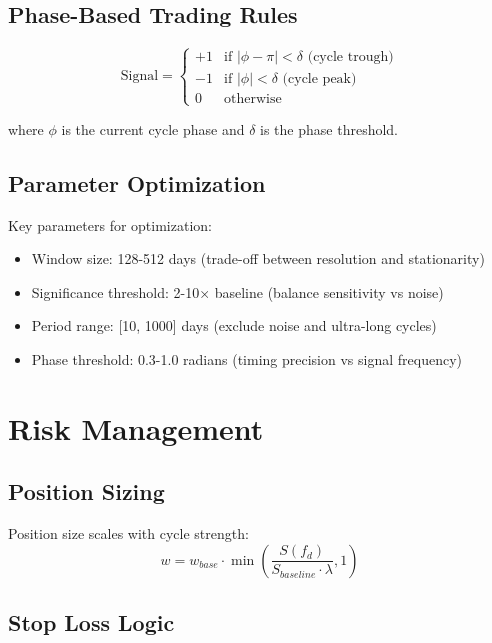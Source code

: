 \documentclass{article}
\begin{document}
\subsection{Phase-Based Trading Rules}

\begin{equation}
\text{Signal} = \begin{cases}
+1 & \text{if } |\phi - \pi| < \delta \text{ (cycle trough)} \\
-1 & \text{if } |\phi| < \delta \text{ (cycle peak)} \\
0 & \text{otherwise}
\end{cases}
\end{equation}

where $\phi$ is the current cycle phase and $\delta$ is the phase threshold.

\subsection{Parameter Optimization}

Key parameters for optimization:
\begin{itemize}
\item Window size: 128-512 days (trade-off between resolution and stationarity)
\item Significance threshold: 2-10× baseline (balance sensitivity vs noise)
\item Period range: [10, 1000] days (exclude noise and ultra-long cycles)
\item Phase threshold: 0.3-1.0 radians (timing precision vs signal frequency)
\end{itemize}

\section{Risk Management}

\subsection{Position Sizing}

Position size scales with cycle strength:
\begin{equation}
w = w_{base} \cdot \min\left(\frac{S(f_d)}{S_{baseline} \cdot \lambda}, 1\right)
\end{equation}

\subsection{Stop Loss Logic}
\end{document}
